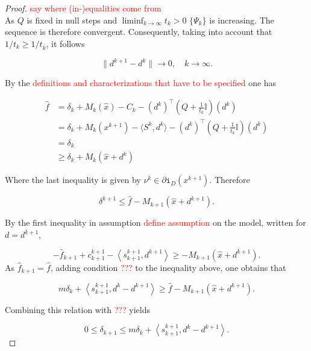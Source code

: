 \begin{proof}
\textcolor{red}{say where (in-)equalities come from} \\

As \(Q\) is fixed in null steps and \(\liminf_{k \to \infty} t_k > 0\) \(\{\Psi_k\}\) is increasing. The sequence is therefore convergent.
Consequently, taking into account that \(1/t_k \geq 1/t_{\bar{k}}\), it follows

\begin{equation}
	\|d^{k+1}-d^k\| \to 0, \quad k \to \infty.
\label{d_to_0}
\end{equation}

By the \textcolor{red}{definitions and characterizations that have to be specified} one has

\begin{align}
	\hat{f} &= \delta_k+M_k(\hat{x})-C_k-\left(d^{k}\right)^{\top}\left(Q+\frac{1}{t_k}\mathbb{I}\right)\left(d^{k}\right) \\
	&= \delta_k + M_k(x^{k+1})-\langle S^k,d^k \rangle-\left(d^{k}\right)^{\top}\left(Q+\frac{1}{t_k}\mathbb{I}\right)\left(d^{k}\right)  \\
	&= \delta_k \\
	&\geq \delta_k+M_k(\hat{x}+d^k)
\end{align}

Where the last inequality is given by \(\nu^k \in \partial\mathtt{i}_{D}(x^{k+1})\). Therefore 

\begin{equation}
	\delta^{k+1} \leq \hat{f}-M_{k+1}(\hat{x}+d^{k+1}).
\end{equation}

By the first inequality in assumption \textcolor{red}{define assumption} on the model, written for \(d=d^{k+1}\),

\begin{equation}
	-\hat{f}_{k+1}+c^{k+1}_{k+1}-\left\langle s^{k+1}_{k+1},d^{k+1}\right\rangle \geq -M_{k+1}(\hat{x}+d^{k+1}).
\end{equation}
As \(\hat{f}_{k+1}=\hat{f}\), adding condition \textcolor{red}{???} to the inequality above, one obtains that

\begin{equation}
	m\delta_k+\left\langle s^{k+1}_{k+1},d^k-d^{k+1}\right\rangle \geq \hat{f}-M_{k+1}(\hat{x}+d^{k+1}).
\end{equation}

Combining this relation with \textcolor{red}{???} yields

\begin{equation}
	0 \leq \delta_{k+1} \leq m\delta_k + \left\langle s^{k+1}_{k+1},d^k-d^{k+1}\right\rangle.
	\label{delta_ineq}
\end{equation}


\end{proof}
